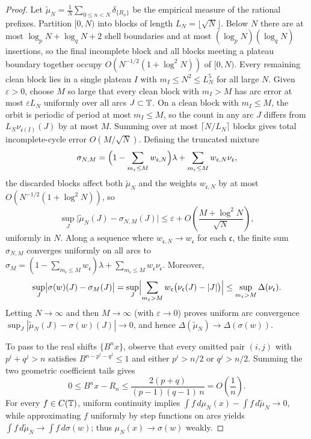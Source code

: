 \documentclass[11pt]{article}
\begin{document}
\begin{proof}
Let $\widetilde\mu_N=\frac1N\sum_{0\le n<N}\delta_{\{R_n\}}$ be the empirical measure of the rational prefixes. Partition $[0,N)$ into blocks of length $L_N=\lfloor\sqrt N\rfloor$. Below $N$ there are at most $\log_p N+\log_q N+2$ shell boundaries and at most $(\log_p N)(\log_q N)$ insertions, so the final incomplete block and all blocks meeting a plateau boundary together occupy $O(N^{-1/2}(1+\log^2 N))$ of $[0,N)$. Every remaining clean block lies in a single plateau $I$ with $m_I\le N^2\le L_N^5$ for all large $N$. Given $\varepsilon>0$, choose $M$ so large that every clean block with $m_I>M$ has arc error at most $\varepsilon L_N$ uniformly over all arcs $J\subset\mathbb T$. On a clean block with $m_I\le M$, the orbit is periodic of period at most $m_I\le M$, so the count in any arc $J$ differs from $L_N\nu_{\mathfrak c(I)}(J)$ by at most $M$. Summing over at most $\lceil N/L_N\rceil$ blocks gives total incomplete-cycle error $O(M/\sqrt N)$. Defining the truncated mixture
\[
 \sigma_{N,M}=\Bigl(1-\sum_{m_{\mathfrak c}\le M}w_{\mathfrak c,N}\Bigr)\lambda+\sum_{m_{\mathfrak c}\le M}w_{\mathfrak c,N}\nu_{\mathfrak c},
\]
the discarded blocks affect both $\widetilde\mu_N$ and the weights $w_{\mathfrak c,N}$ by at most $O(N^{-1/2}(1+\log^2 N))$, so
\[
 \sup_J\bigl|\widetilde\mu_N(J)-\sigma_{N,M}(J)\bigr|\le \varepsilon+O\!\left(\frac{M+\log^2 N}{\sqrt N}\right),
\]
uniformly in $N$. Along a sequence where $w_{\mathfrak c,N}\to w_{\mathfrak c}$ for each $\mathfrak c$, the finite sum $\sigma_{N,M}$ converges uniformly on all arcs to $\sigma_M=(1-\sum_{m_{\mathfrak c}\le M}w_{\mathfrak c})\lambda+\sum_{m_{\mathfrak c}\le M}w_{\mathfrak c}\nu_{\mathfrak c}$. Moreover,
\[
 \sup_J\bigl|\sigma(w)(J)-\sigma_M(J)\bigr|
 =\sup_J\Bigl|\sum_{m_{\mathfrak c}>M}w_{\mathfrak c}\bigl(\nu_{\mathfrak c}(J)-|J|\bigr)\Bigr|
 \le \sup_{m_{\mathfrak c}>M}\Delta(\nu_{\mathfrak c}).
\]
Letting $N\to\infty$ and then $M\to\infty$ (with $\varepsilon\to0$) proves uniform arc convergence $\sup_J|\widetilde\mu_N(J)-\sigma(w)(J)|\to0$, and hence $\Delta(\widetilde\mu_N)\to\Delta(\sigma(w))$.

To pass to the real shifts $\{B^n x\}$, observe that every omitted pair $(i,j)$ with $p^i+q^j>n$ satisfies $B^{n-p^i-q^j}\le 1$ and either $p^i>n/2$ or $q^j>n/2$. Summing the two geometric coefficient tails gives
\[
 0\le B^n x-R_n\le \frac{2(p+q)}{(p-1)(q-1)\,n}=O\!\left(\frac1n\right).
\]
For every $f\in C(\mathbb T)$, uniform continuity implies $\int f\,d\mu_N(x)-\int f\,d\widetilde\mu_N\to0$, while approximating $f$ uniformly by step functions on arcs yields $\int f\,d\widetilde\mu_N\to\int f\,d\sigma(w)$; thus $\mu_N(x)\to\sigma(w)$ weakly.


\end{proof}
\end{document}
